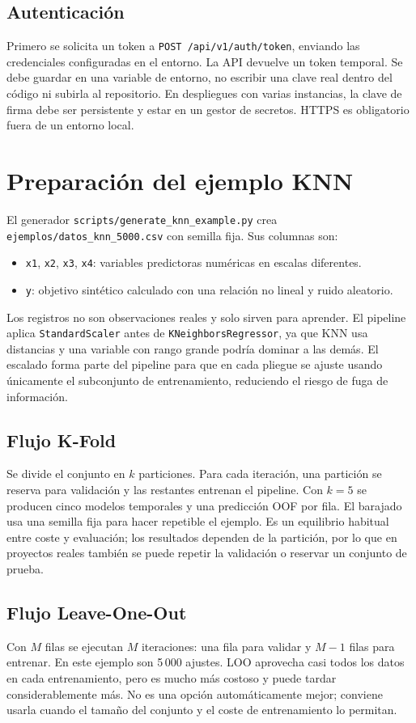 \documentclass[11pt,a4paper]{article}
\begin{document}
\subsection{Autenticación}
Primero se solicita un token a \texttt{POST /api/v1/auth/token}, enviando las credenciales configuradas en el entorno. La API devuelve un token temporal. Se debe guardar en una variable de entorno, no escribir una clave real dentro del código ni subirla al repositorio. En despliegues con varias instancias, la clave de firma debe ser persistente y estar en un gestor de secretos. HTTPS es obligatorio fuera de un entorno local.

\section{Preparación del ejemplo KNN}
El generador \texttt{scripts/generate\_knn\_example.py} crea \texttt{ejemplos/datos\_knn\_5000.csv} con semilla fija. Sus columnas son:
\begin{itemize}
  \item \texttt{x1}, \texttt{x2}, \texttt{x3}, \texttt{x4}: variables predictoras numéricas en escalas diferentes.
  \item \texttt{y}: objetivo sintético calculado con una relación no lineal y ruido aleatorio.
\end{itemize}
Los registros no son observaciones reales y solo sirven para aprender. El pipeline aplica \texttt{StandardScaler} antes de \texttt{KNeighborsRegressor}, ya que KNN usa distancias y una variable con rango grande podría dominar a las demás. El escalado forma parte del pipeline para que en cada pliegue se ajuste usando únicamente el subconjunto de entrenamiento, reduciendo el riesgo de fuga de información.

\subsection{Flujo K-Fold}
Se divide el conjunto en \(k\) particiones. Para cada iteración, una partición se reserva para validación y las restantes entrenan el pipeline. Con \(k=5\) se producen cinco modelos temporales y una predicción OOF por fila. El barajado usa una semilla fija para hacer repetible el ejemplo. Es un equilibrio habitual entre coste y evaluación; los resultados dependen de la partición, por lo que en proyectos reales también se puede repetir la validación o reservar un conjunto de prueba.

\subsection{Flujo Leave-One-Out}
Con \(M\) filas se ejecutan \(M\) iteraciones: una fila para validar y \(M-1\) filas para entrenar. En este ejemplo son 5\,000 ajustes. LOO aprovecha casi todos los datos en cada entrenamiento, pero es mucho más costoso y puede tardar considerablemente más. No es una opción automáticamente mejor; conviene usarla cuando el tamaño del conjunto y el coste de entrenamiento lo permitan.
\end{document}
